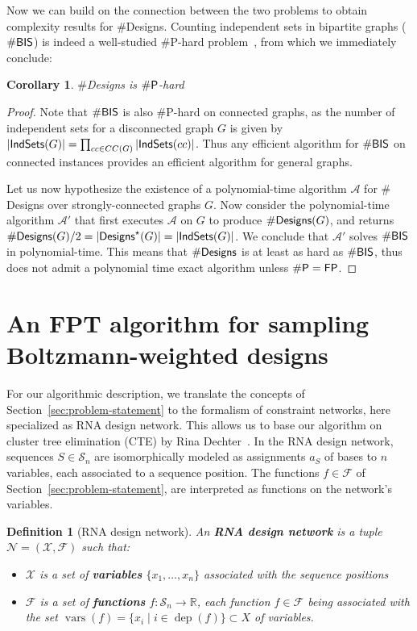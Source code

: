 \documentclass{bioinfo}
\newtheorem{definition}[theorem]{Definition}
\newtheorem{corollary}[theorem]{Corollary}
\newcommand{\network}{\mathcal{N}}
\newcommand{\val}{a} %
\newcommand{\vars}{\operatorname{vars}}
\newcommand{\dep}{\operatorname{dep}}
\newcommand{\real}{\mathbb{R}}
\newcommand{\F}{\mathcal{F}}
\renewcommand{\S}{\mathcal{S}}
\newcommand{\X}{\mathcal{X}}
\newcommand{\Def}[1]{{\bf #1}}
\newcommand{\Design}[1]{{\sf Designs}^{\star}(#1)}
\newcommand{\NumDesign}{\ensuremath{\#}{\sf Designs}\xspace}
\newcommand{\IS}[1]{{\sf IndSets}(#1)}
\begin{document}
Now we can build on the connection between the two problems to obtain complexity results for \NumDesign. Counting independent sets in bipartite graphs ($\#{\sf BIS}$) is indeed a well-studied \#{\sf P}-hard problem~\cite{Ge2012}, from which we immediately conclude:
\begin{corollary}
  \NumDesign is $\#{\sf P}$-hard
\end{corollary}
\begin{proof}
  Note that $\#{\sf BIS}$ is also \#{\sf P}-hard on connected graphs, as the number of independent sets for a disconnected graph $G$ is given by $|\IS{G}|=\prod_{cc\in CC(G)} |\IS{cc}|$. Thus any efficient algorithm for $\#{\sf BIS}$ on connected instances provides an efficient algorithm for general graphs.
  
  Let us now hypothesize the existence of a polynomial-time algorithm $\mathcal{A}$ for \NumDesign over strongly-connected graphs $G$. Now consider the polynomial-time algorithm $\mathcal{A}'$ that first executes $\mathcal{A}$ on $G$ to produce $\NumDesign(G)$, and returns $\NumDesign(G)/2=|\Design{G}| = |\IS{G}|$. We conclude that $\mathcal{A}'$ solves $\#{\sf BIS}$ in polynomial-time. This means that $\NumDesign$  is at least as hard as $\#{\sf BIS}$, thus does not admit a polynomial time exact algorithm unless $\#{\sf P}={\sf FP}$.
\end{proof}

\section{An FPT algorithm for sampling Boltzmann-weighted designs}
\label{sec:FPT}

For our algorithmic description, we translate the concepts of
Section~\ref{sec:problem-statement} to the formalism of constraint networks, here
specialized as RNA design network. This allows us to base our
algorithm on cluster tree elimination (CTE) by Rina
Dechter~\cite{Dechter2013}.
%
In the RNA design network, sequences $S\in\S_n$ are isomorphically
modeled as assignments $\val_S$ of bases to $n$ variables, each associated to
a sequence position. The functions $f\in\F$ of
Section~\ref{sec:problem-statement}, are interpreted as functions on the network's variables.

\begin{definition}[RNA design network]
An \Def{RNA design network} is a tuple $\network=(\X,\F)$ such that:
\begin{itemize}
\item $\X$ is a set of \Def{variables} $\{x_1,\dots,x_n\}$ associated with the sequence positions
\item $\F$ is a set of \Def{functions} $f:\S_n\to\real$, each function $f\in \F$ being associated with the set $\vars(f)=\{x_i\mid i\in\dep(f) \}\subset X$ of variables.
\end{itemize}
\end{definition}
\end{document}
